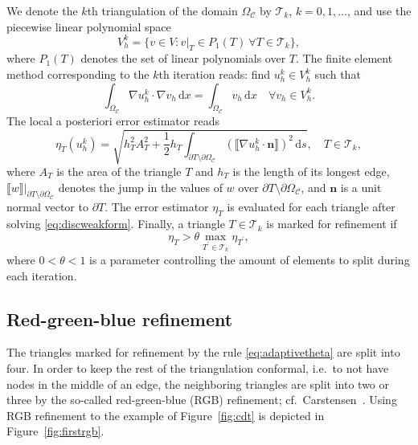 \documentclass[11pt]{article}
\begin{document}
We denote the \(k\)th triangulation of the
domain \(\Omega_{\mathcal{C}}\) by \(\mathcal{T}_k\), \(k=0,1,\dots\), and
use the piecewise linear polynomial space
$$V_h^k = \{ v \in V : v|_T \in P_1(T)~\forall T \in \mathcal{T}_k \},$$
where $P_1(T)$ denotes the set of linear polynomials over $T$.
The finite element method corresponding to the \(k\)th iteration reads:
find \(u_h^k \in V_h^k\) such that
\begin{equation}
   \label{eq:discweakform}
   \int_{\Omega_{\mathcal{C}}} \nabla u_h^k \cdot \nabla v_h \,\mathrm{d}x = \int_{\Omega_{\mathcal{C}}} v_h\,\mathrm{d}x \quad \forall v_h \in V_h^k.
\end{equation}
The local a posteriori error estimator
reads
\begin{equation}
        \eta_T(u_h^k) = \sqrt{h_T^2 A_T^2 + \frac12 h_T \int_{\partial T \setminus \partial \Omega_{\mathcal{C}}} (\llbracket \nabla u_h^k \cdot \boldsymbol{n} \rrbracket)^2 \,\mathrm{d}s}, \quad T \in \mathcal{T}_k,
\end{equation}
where $A_T$ is the area of the triangle $T$ and $h_T$ is the length of its longest edge, $\llbracket w \rrbracket |_{\partial T \setminus \partial \Omega_{\mathcal{C}}}$ denotes the jump in the values of
$w$ over $\partial T \setminus \partial \Omega_{\mathcal{C}}$, and $\boldsymbol{n}$ is a unit normal vector to
$\partial T$.
The error estimator $\eta_T$ is evaluated for each triangle
after solving \eqref{eq:discweakform}.
Finally, a triangle $T \in \mathcal{T}_k$ is marked for refinement if
\begin{equation}
  \label{eq:adaptivetheta}
   \eta_T > \theta \max_{T^\prime \in \mathcal{T}_k} \eta_{T^\prime},
\end{equation}
where $0 < \theta < 1$ is a parameter controlling the amount
of elements to split during each iteration. \cite{Verf_rth_2013}

\subsection{Red-green-blue refinement}
\label{sec:rgb}

The triangles marked for refinement by the rule \eqref{eq:adaptivetheta} are
split into four.  In order to keep the rest of the triangulation conformal,
i.e.~to not have nodes in the middle of an edge, the neighboring triangles
are split into two or three by the so-called red-green-blue (RGB) refinement;
cf.~Carstensen~\cite{carstensen2004adaptive}.  Using RGB refinement to the
example of Figure~\ref{fig:cdt} is depicted in Figure~\ref{fig:firstrgb}.
\end{document}

